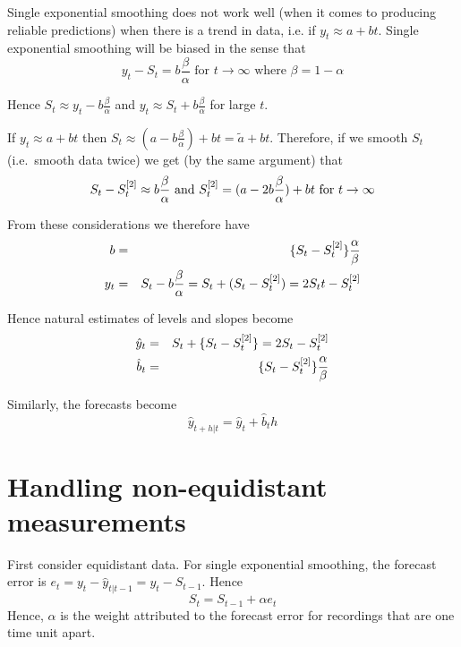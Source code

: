 \documentclass[10pt]{article}\usepackage[]{graphicx}\usepackage[]{color}
\begin{document}
Single exponential smoothing does not work well (when it comes to producing reliable predictions) when there is a trend
in data, i.e. if $y_t \approx a + b t$.
Single exponential smoothing will be biased in the sense that
\begin{displaymath}
  y_t -S_t = b \frac{\beta}{\alpha} \mbox{ for } t\rightarrow\infty
  \mbox{ where } \beta=1-\alpha
\end{displaymath}

Hence $S_t \approx y_t - b \frac{\beta}{\alpha}$ and $y_t \approx S_t
+ b \frac{\beta}{\alpha}$ for large $t$.

If $y_t \approx a + b t$ then $S_t \approx ( a  - b
\frac{\beta}{\alpha}) + bt = \tilde a + bt$.
Therefore, if we smooth $S_t$ (i.e.\ smooth data twice) we get (by the same
argument) that
\begin{displaymath}
  S_t - S^{[2]}_t \approx b \frac{\beta}{\alpha}
\mbox{ and }
  S^{[2]}_t = (a - 2b \frac {\beta} \alpha) + bt \mbox{ for } t\rightarrow\infty
\end{displaymath}

From these considerations we therefore have
\begin{eqnarray}
  \label{eq:ses4}
  b &=& \{ S_t-S^{[2]}_t\}\frac\alpha\beta  \\
  y_t &=& S_t- b\frac{\beta}{\alpha} = S_t+(S_t-S^{[2]}_t)=2S_tt-S^{[2]}_t
\end{eqnarray}

Hence natural estimates of levels and slopes become
\begin{eqnarray}
  \label{eq:des6}
    \hat y_t   &=& S_t+\{S_t-S^{[2]}_t\}=2S_t-S^{[2]}_t\\
    \hat b_t  &=& \{S_t-S^{[2]}_t\}\frac \alpha\beta
\end{eqnarray}

Similarly, the forecasts become
\begin{equation}
  \label{eq:des7}
  \hat y_{t+h|t} = \hat y_t + \hat b_t h
\end{equation}


\section{Handling non-equidistant measurements}
\label{sec:handl-non-equid}

First consider equidistant data.  For single exponential smoothing,
the forecast error is $e_t=y_t-\hat y_{t|t-1}=y_t - S_{t-1}$. Hence
\begin{displaymath}
  S_t = S_{t-1} + \alpha e_t
\end{displaymath}
Hence, $\alpha$ is the weight attributed to the forecast error for
recordings that are one time unit apart.
\end{document}
